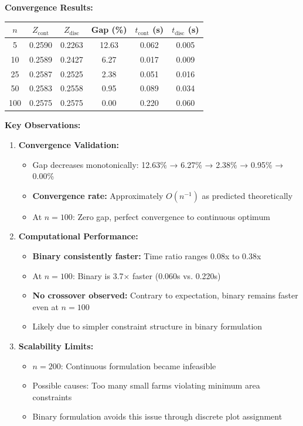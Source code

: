 \documentclass{oqireport}
\begin{document}
\textbf{Convergence Results:}

\begin{center}
\begin{tabular}{cccccc}
\hline
$n$ & $Z_{\text{cont}}$ & $Z_{\text{disc}}$ & Gap (\%) & $t_{\text{cont}}$ (s) & $t_{\text{disc}}$ (s) \\
\hline
5 & 0.2590 & 0.2263 & 12.63 & 0.062 & 0.005 \\
10 & 0.2589 & 0.2427 & 6.27 & 0.017 & 0.009 \\
25 & 0.2587 & 0.2525 & 2.38 & 0.051 & 0.016 \\
50 & 0.2583 & 0.2558 & 0.95 & 0.089 & 0.034 \\
100 & 0.2575 & 0.2575 & 0.00 & 0.220 & 0.060 \\
\hline
\end{tabular}
\end{center}

\textbf{Key Observations:}

\begin{enumerate}
    \item \textbf{Convergence Validation:}
    \begin{itemize}
        \item Gap decreases monotonically: 12.63\% → 6.27\% → 2.38\% → 0.95\% → 0.00\%
        \item \textbf{Convergence rate:} Approximately $O(n^{-1})$ as predicted theoretically
        \item At $n = 100$: Zero gap, perfect convergence to continuous optimum
    \end{itemize}
    
    
    \item \textbf{Computational Performance:}
    \begin{itemize}
        \item \textbf{Binary consistently faster:} Time ratio ranges 0.08x to 0.38x
        \item At $n = 100$: Binary is 3.7$\times$ faster (0.060s vs. 0.220s)
        \item \textbf{No crossover observed:} Contrary to expectation, binary remains faster even at $n = 100$
        \item Likely due to simpler constraint structure in binary formulation
    \end{itemize}
    
    \item \textbf{Scalability Limits:}
    \begin{itemize}
        \item $n = 200$: Continuous formulation became infeasible
        \item Possible causes: Too many small farms violating minimum area constraints
        \item Binary formulation avoids this issue through discrete plot assignment
    \end{itemize}
\end{enumerate}
\end{document}
